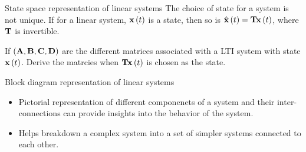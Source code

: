 \documentclass[aspectratio=169]{beamer}
\def\mf{\ensuremath\mathbf}
\def\lp{\ensuremath\left(}
\def\rp{\ensuremath\right)}
\newcommand{\ct}[1]{\lp #1\rp}
\begin{document}
\begin{frame}[t]{State space representation of linear systems}
The choice of state for a system is not unique. If for a linear system, $\mf{x}\ct{t}$ is a state, then so is $\hat{\mf{x}}\ct{t} = \mf{T}\mf{x}\ct{t}$, where $\mf{T}$ is invertible.

\vspace{0.5cm}

If $\lp \mf{A}, \mf{B}, \mf{C}, \mf{D}\rp$ are the different matrices associated with a LTI system with state $\mf{x}\ct{t}$. Derive the matrcies when $\mf{T}\mf{x}\ct{t}$ is chosen as the state.
\end{frame}


\begin{frame}{Block diagram representation of linear systems} 
\begin{itemize}
    \item Pictorial representation of different componenets of a system and their  inter-connections can provide insights into the behavior of the system.

    \item Helps breakdown a complex system into a set of simpler systems connected to each other.


\end{itemize}
\end{frame}
\end{document}
